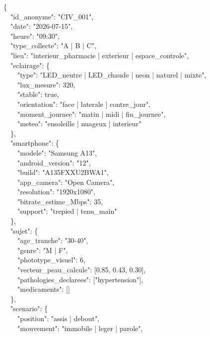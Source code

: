 \documentclass[11pt,a4paper]{article}
\begin{document}
\begin{codebox}
\{\\
\ \ "id\_anonyme": "CIV\_001",\\
\ \ "date": "2026-07-15",\\
\ \ "heure": "09:30",\\
\ \ "type\_collecte": "A | B | C",\\
\ \ "lieu": "interieur\_pharmacie | exterieur | espace\_controle",\\[2pt]
\ \ "eclairage": \{\\
\ \ \ \ "type": "LED\_neutre | LED\_chaude | neon | naturel | mixte",\\
\ \ \ \ "lux\_mesure": 320,\\
\ \ \ \ "stable": true,\\
\ \ \ \ "orientation": "face | laterale | contre\_jour",\\
\ \ \ \ "moment\_journee": "matin | midi | fin\_journee",\\
\ \ \ \ "meteo": "ensoleille | nuageux | interieur"\\
\ \ \},\\[2pt]
\ \ "smartphone": \{\\
\ \ \ \ "modele": "Samsung A13",\\
\ \ \ \ "android\_version": "12",\\
\ \ \ \ "build": "A135FXXU2BWA1",\\
\ \ \ \ "app\_camera": "Open Camera",\\
\ \ \ \ "resolution": "1920x1080",\\
\ \ \ \ "bitrate\_estime\_Mbps": 35,\\
\ \ \ \ "support": "trepied | tenu\_main"\\
\ \ \},\\[2pt]
\ \ "sujet": \{\\
\ \ \ \ "age\_tranche": "30-40",\\
\ \ \ \ "genre": "M | F",\\
\ \ \ \ "phototype\_visuel": 6,\\
\ \ \ \ "vecteur\_peau\_calcule": [0.85, 0.43, 0.30],\\
\ \ \ \ "pathologies\_declarees": ["hypertension"],\\
\ \ \ \ "medicaments": []\\
\ \ \},\\[2pt]
\ \ "scenario": \{\\
\ \ \ \ "position": "assis | debout",\\
\ \ \ \ "mouvement": "immobile | leger | parole",\\

\end{codebox}
\end{document}
